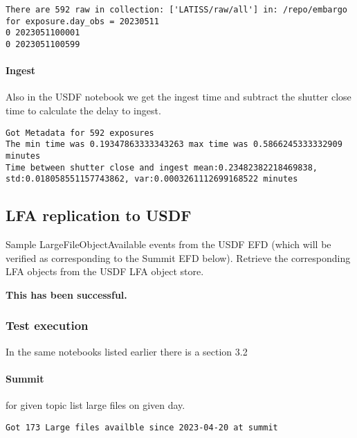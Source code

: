 \begin{lstlisting}
There are 592 raw in collection: ['LATISS/raw/all'] in: /repo/embargo for exposure.day_obs = 20230511
0 2023051100001
0 2023051100599
\end{lstlisting}

\paragraph {Ingest}
Also in the USDF notebook we get the ingest time and subtract the shutter close time to calculate the
delay to ingest.
\begin{lstlisting}
Got Metadata for 592 exposures
The min time was 0.19347863333343263 max time was 0.5866245333332909 minutes
Time between shutter close and ingest mean:0.23482382218469838, std:0.018058551157743862, var:0.0003261112699168522 minutes
\end{lstlisting}

\subsection{LFA replication to USDF }
Sample LargeFileObjectAvailable events from the USDF EFD (which will be verified as corresponding to the Summit EFD below).
Retrieve the corresponding LFA objects from the USDF LFA object store.

\textbf{This has been successful.}
\subsubsection{Test execution}
In the same notebooks  listed earlier there is a section 3.2

\paragraph{Summit} for given topic list large files on given day.
\begin{lstlisting}
Got 173 Large files availble since 2023-04-20 at summit
\end{lstlisting}

